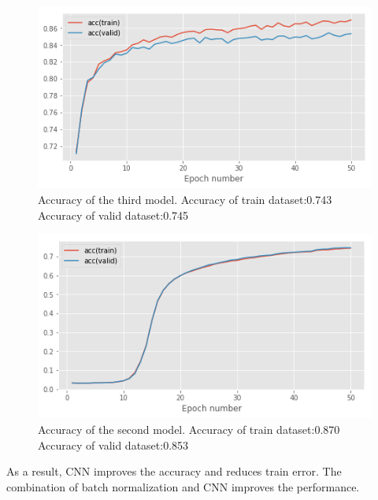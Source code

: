\documentclass{article}
\begin{document}
\begin{figure}[h]
\vskip 5mm
\begin{center}
\centerline{\includegraphics[width=\columnwidth]{m.jpg}}
\caption{Accuracy of the third model. \n
Accuracy of train dataset:0.743 \n
Accuracy of valid dataset:0.745
}
\end{center}
\vskip -5mm
\end{figure}

\begin{figure}[h]
\vskip 5mm
\begin{center}
\centerline{\includegraphics[width=\columnwidth]{l.jpg}}
\caption{Accuracy of the second model. \n
Accuracy of train dataset:0.870\n
Accuracy of valid dataset:0.853
}
\end{center}
\vskip -5mm
\end{figure}

As a result, CNN improves the accuracy and reduces train error. The combination of batch normalization and CNN improves the performance.

\end{document}
